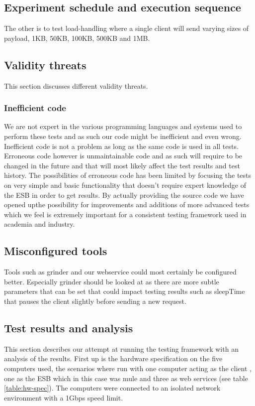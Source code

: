 \subsection{Experiment schedule and execution sequence}
The other is to test load-handling where a single client will send varying sizes of payload, 1KB, 50KB, 100KB, 500KB and 1MB.
\subsection{Validity threats}
This section discusses different validity threats.
\subsubsection{Inefficient code}
We are not expert in the various programming languages and systems used to perform these tests and as such our code might be inefficient and even wrong. Inefficient code is not a problem as long as the same code is used in all tests. Erroneous code however is unmaintainable code and as such will require to be changed in the future and that will most likely affect the test results and test history. 
The possibilities of erroneous code has been limited by focusing the tests on very simple and basic functionality that doesn't require expert knowledge of the ESB in order to get results.
By actually providing the source code we have opened upthe possibility for improvements and additions of more advanced tests which we feel is extremely important for a consistent testing framework used in academia and industry.

\subsection{Misconfigured tools}
Tools such as grinder and our webservice could most certainly be configured better. Especially grinder should be looked at as there are more subtle parameters that can be set that could impact testing results such as sleepTime that pauses the client slightly before sending a new request.

\subsection{Test results and analysis}

This section describes our attempt at running the testing framework with an analysis of the results.
First up is the hardware specification on the five computers used, the scenarios where run with one computer acting as the client , one as the ESB which in this case was mule  and three as web services (see table \ref{table:hw-spec}). 
The computers were connected to an isolated network environment with a 1Gbps speed limit.

